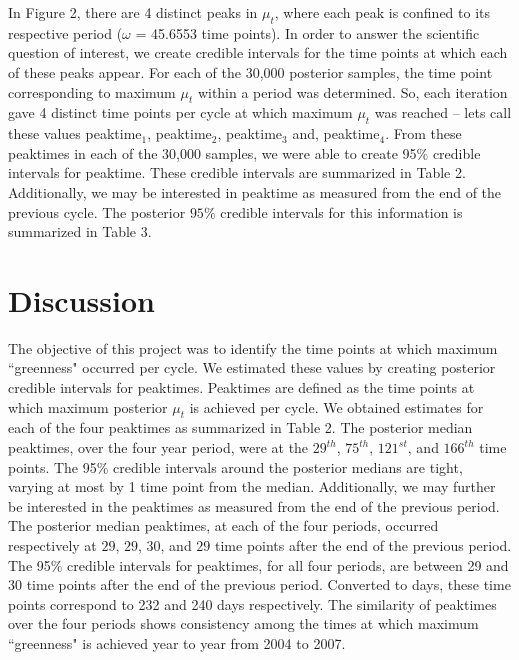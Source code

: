 \documentclass[12pt, a4paper]{article}
\begin{document}
In Figure 2, there are 4 distinct peaks in $\mu_{t}$, where each peak is confined to its respective period ($\omega$ = 45.6553 time points). In order to answer the scientific question of interest, we create credible intervals for the time points at which each of these peaks appear. For each of the 30,000 posterior samples, the time point corresponding to maximum $\mu_{t}$ within a period was determined. So, each iteration gave 4 distinct time points per cycle at which maximum $\mu_{t}$ was reached -- lets call these values peaktime$_{1}$, peaktime$_{2}$, peaktime$_{3}$ and, peaktime$_{4}$. From these peaktimes in each of the 30,000 samples, we were able to create 95$\%$ credible intervals for peaktime. These credible intervals are summarized in Table 2. Additionally, we may be interested in peaktime as measured from the end of the previous cycle. The posterior $95\%$ credible intervals for this information is summarized in Table 3.      
\section{Discussion}
\qquad The objective of this project was to identify the time points at which maximum ``greenness" occurred per cycle. We estimated these values by creating posterior credible intervals for peaktimes. Peaktimes are defined as the time points at which maximum posterior $\mu_{t}$ is achieved per cycle. We obtained estimates for each of the four peaktimes as summarized in Table 2. The posterior median peaktimes, over the four year period, were at the $29^{th}$, $75^{th}$, $121^{st}$, and $166^{th}$ time points. The 95$\%$ credible intervals around the posterior medians are tight, varying at most by 1 time point from the median. Additionally, we may further be interested in the peaktimes as measured from the end of the previous period. The posterior median peaktimes, at each of the four periods, occurred respectively at $29$, $29$, $30$, and $29$ time points after the end of the previous period. The 95$\%$ credible intervals for peaktimes, for all four periods, are between 29 and 30 time points after the end of the previous period. Converted to days, these time points correspond to 232 and 240 days respectively. The similarity of peaktimes over the four periods shows consistency among the times at which maximum ``greenness" is achieved year to year from 2004 to 2007. 
\end{document}
